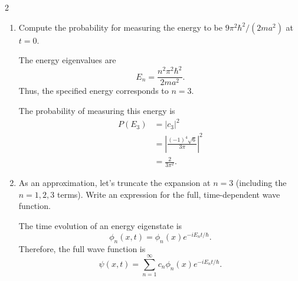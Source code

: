 \documentclass[11pt]{article}
\begin{document}
\begin{problem}{2}
\begin{enumerate}[label=(\alph*)]
\begin{answer}
    Integrating by parts,
    \begin{equation}
      \label{eq:p2-integral}
      \begin{aligned}
        &\int_0^a x\sin\left(\frac{n\pi x}{a}\right)
        \dd{x} \\
        &\quad =
        \left[
        -\frac{ax}{n\pi}
        \cos\left(\frac{n\pi x}{a}\right)
        +\frac{a^2}{n^2\pi^2}
        \sin\left(\frac{n\pi x}{a}\right)
        \right]_0^a \\
        &\quad =-\frac{a^2}{n\pi}(-1)^n.
      \end{aligned}
    \end{equation}

    Substituting gives
    \begin{equation}
      \label{eq:p2-coefficients}
      \boxed{c_n=\frac{(-1)^{n+1}\sqrt{6}}{n\pi}}.
    \end{equation}
          \end{answer}

    \item Compute the probability for measuring the energy to be \(9\pi^2\hbar^2/(2ma^2)\) at \(t=0\).
          \begin{answer}
  The energy eigenvalues are
    \begin{equation}
      \label{eq:p2-energies}
      E_n=\frac{n^2\pi^2\hbar^2}{2ma^2}.
    \end{equation}
    Thus, the specified energy corresponds to \(n=3\).

    The probability of measuring this energy is
    \begin{equation}
      \label{eq:p2-probability}
      \begin{aligned}
        P(E_3)
        &= |c_3|^2 \\
        &= \left|
        \frac{(-1)^4\sqrt{6}}{3\pi}
        \right|^2 \\
        &= \boxed{\frac{2}{3\pi^2}}.
      \end{aligned}
    \end{equation}
          \end{answer}

    \item As an approximation, let's truncate the expansion at \(n=3\) (including the \(n=1,2,3\) terms).
      Write an expression for the full, time-dependent wave function.
          \begin{answer}
    The time evolution of an energy eigenstate is
    \begin{equation}
      \label{eq:p2-time-evolution}
      \phi_n(x,t)=\phi_n(x)e^{-iE_nt/\hbar}.
    \end{equation}
    Therefore, the full wave function is
    \begin{equation}
      \label{eq:p2-full-series}
      \psi(x,t)
      =\sum_{n=1}^{\infty}
      c_n\phi_n(x)e^{-iE_nt/\hbar}.
    \end{equation}


\end{answer}
\end{enumerate}
\end{problem}
\end{document}
